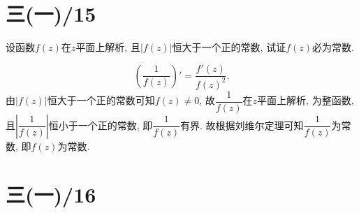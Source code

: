 \documentclass[11pt,a4paper]{article}
\author{刘逸灏 (515370910207)}
\begin{document}
\maketitle

\section{三(一)/15}
\begin{problem}
设函数$f(z)$在$z$平面上解析, 且$|f(z)|$恒大于一个正的常数, 试证$f(z)$必为常数.
\end{problem}
$$\left(\frac{1}{f(z)}\right)'=\frac{f'(z)}{f(z)^2}.$$
由$|f(z)|$恒大于一个正的常数可知$f(z)\neq 0$, 故$\dfrac{1}{f(z)}$在$z$平面上解析, 为整函数, 且$\left|\dfrac{1}{f(z)}\right|$恒小于一个正的常数, 即$\dfrac{1}{f(z)}$有界. 故根据刘维尔定理可知$\dfrac{1}{f(z)}$为常数, 即$f(z)$为常数.

\section{三(一)/16}
\end{document}
